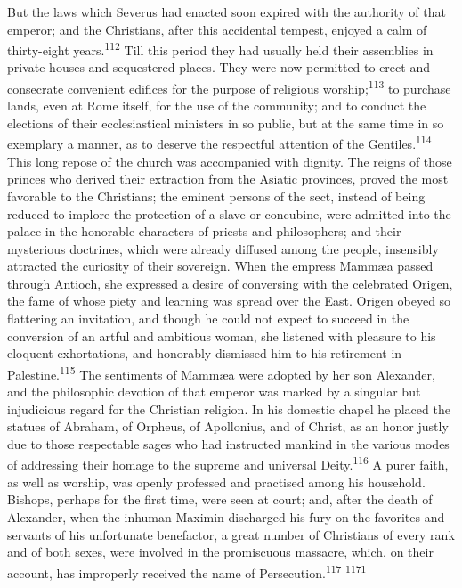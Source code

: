 But the laws which Severus had enacted soon expired with the
authority of that emperor; and the Christians, after this
accidental tempest, enjoyed a calm of thirty-eight years.\textsuperscript{112}
Till this period they had usually held their assemblies in
private houses and sequestered places. They were now permitted to
erect and consecrate convenient edifices for the purpose of
religious worship;\textsuperscript{113} to purchase lands, even at Rome itself,
for the use of the community; and to conduct the elections of
their ecclesiastical ministers in so public, but at the same time
in so exemplary a manner, as to deserve the respectful attention
of the Gentiles.\textsuperscript{114} This long repose of the church was
accompanied with dignity. The reigns of those princes who derived
their extraction from the Asiatic provinces, proved the most
favorable to the Christians; the eminent persons of the sect,
instead of being reduced to implore the protection of a slave or
concubine, were admitted into the palace in the honorable
characters of priests and philosophers; and their mysterious
doctrines, which were already diffused among the people,
insensibly attracted the curiosity of their sovereign. When the
empress Mammæa passed through Antioch, she expressed a desire of
conversing with the celebrated Origen, the fame of whose piety
and learning was spread over the East. Origen obeyed so
flattering an invitation, and though he could not expect to
succeed in the conversion of an artful and ambitious woman, she
listened with pleasure to his eloquent exhortations, and
honorably dismissed him to his retirement in Palestine.\textsuperscript{115} The
sentiments of Mammæa were adopted by her son Alexander, and the
philosophic devotion of that emperor was marked by a singular but
injudicious regard for the Christian religion. In his domestic
chapel he placed the statues of Abraham, of Orpheus, of
Apollonius, and of Christ, as an honor justly due to those
respectable sages who had instructed mankind in the various modes
of addressing their homage to the supreme and universal Deity.\textsuperscript{116}
A purer faith, as well as worship, was openly professed and
practised among his household. Bishops, perhaps for the first
time, were seen at court; and, after the death of Alexander, when
the inhuman Maximin discharged his fury on the favorites and
servants of his unfortunate benefactor, a great number of
Christians of every rank and of both sexes, were involved in the
promiscuous massacre, which, on their account, has improperly
received the name of Persecution.\textsuperscript{117} \textsuperscript{1171}

